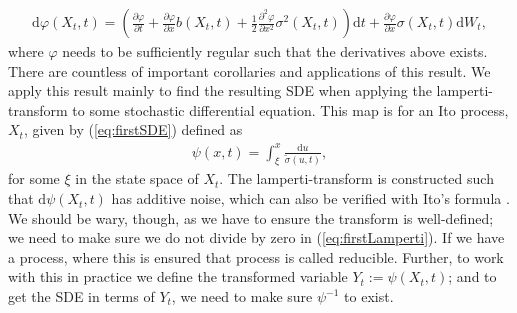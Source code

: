 \begin{align}
    \mathrm{d}\varphi(X_t, t) = \left(\frac{\partial \varphi}{\partial t} + \frac{\partial\varphi}{\partial x}b(X_t, t) + \frac{1}{2} \frac{\partial^2 \varphi}{\partial x^2}\sigma^2(X_t, t) \right)\mathrm{d}t + \frac{\partial\varphi}{\partial x}\sigma(X_t, t) \mathrm{d}W_t, \label{eq:ItoFormula}
\end{align}
where $\varphi$ needs to be sufficiently regular such that the derivatives above exists. 
There are countless of important corollaries and applications of this result. We apply this result mainly to find the resulting SDE when applying the lamperti-transform to some stochastic differential equation. This map is for an Ito process, $X_t$, given by (\ref{eq:firstSDE}) defined as
\begin{align}
    \psi(x, t) = \int_{\xi}^x \frac{\mathrm{d}u}{\tilde{\sigma}(u, t)}, \label{eq:firstLamperti}
\end{align}
for some $\xi$ in the state space of $X_t$. The lamperti-transform is constructed such that $\mathrm{d}\psi(X_t, t)$ has additive noise, which can also be verified with Ito's formula \cite[equation (7.5)]{Srkk2019}. We should be wary, though, as we have to ensure the transform is well-defined; we need to make sure we do not divide by zero in (\ref{eq:firstLamperti}). If we have a process, where this is ensured that process is called reducible. Further, to work with this in practice we define the transformed variable $Y_t := \psi(X_t, t)$; and to get the SDE in terms of $Y_t$, we need to make sure $\psi^{-1}$ to exist.

